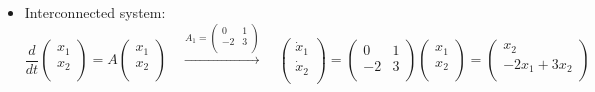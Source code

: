 \begin{ex}{}
\begin{itemize}
\item Interconnected system:
\begin{equation*}
\frac{d}{dt} 
\begin{pmatrix}
x_{1}\\
x_{2}\\
\end{pmatrix}
=A
\begin{pmatrix}
x_{1}\\
x_{2}\\
\end{pmatrix}\quad \xrightarrow{A_{1}=\begin{pmatrix}
0 & 1\\
-2 & 3\\
\end{pmatrix}} \quad 
\begin{pmatrix}
\dot{x}_{1}\\
\dot{x}_{2}\\
\end{pmatrix} = 
\begin{pmatrix}
0 & 1\\
-2 & 3\\
\end{pmatrix}
\begin{pmatrix}
x_{1}\\
x_{2}\\
\end{pmatrix} = \begin{pmatrix}
x_{2}\\
-2x_{1}+3x_{2}\\
\end{pmatrix}
\end{equation*}


\end{itemize}
\end{ex}
